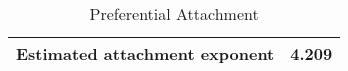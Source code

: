 \begin{table}[!h]

\caption{Preferential Attachment}
\centering
\begin{tabular}[t]{lr}
\toprule
Estimated attachment exponent & 4.209\\
\bottomrule
\end{tabular}
\end{table}
